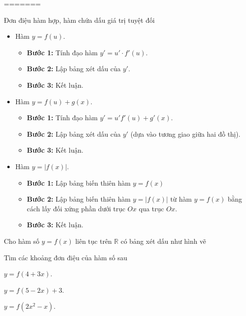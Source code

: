 =======
\begin{dang}{Đơn điệu hàm hợp, hàm chứa dấu giá trị tuyệt đối}
    \begin{itemize}
        \item Hàm $y=f(u)$.
        \begin{itemize}
            \item \textbf{Bước 1:} Tính đạo hàm $y'=u'\cdot f'(u)$.
            \item \textbf{Bước 2:} Lập bảng xét dấu của $y'$.
            \item \textbf{Bước 3:} Kết luận.
        \end{itemize}
        \item Hàm $y=f(u)+g(x)$.
        \begin{itemize}
            \item \textbf{Bước 1:} Tính đạo hàm $y'=u'f'(u)+g'(x)$.
            \item \textbf{Bước 2:} Lập bảng xét dấu của $y'$ (dựa vào tương giao giữa hai đồ thị).
            \item \textbf{Bước 3:} Kết luận.
        \end{itemize}
        \item Hàm $y=|f(x)|$.
        \begin{itemize}
            \item \textbf{Bước 1:} Lập bảng biến thiên hàm $y=f(x)$
            \item \textbf{Bước 2:} Lập bảng biến thiên hàm $y=|f(x)|$ từ hàm $y=f(x)$ bằng cách lấy đối xứng phần dưới trục $Ox$ qua trục $Ox$.
            \item \textbf{Bước 3:} Kết luận.
        \end{itemize}
    \end{itemize}
\end{dang}
\begin{vd}%
    Cho hàm số $y=f(x)$ liên tục trên $\mathbb{R}$ có bảng xét dấu như hình vẽ
    \begin{center}
    \end{center}
    Tìm các khoảng đơn điệu của hàm số sau
    \begin{listEX}[3]
        \item $y=f(4+3x)$.
        \item $y=f(5-2x)+3$.
        \item $y=f(2x^2-x)$.
    \end{listEX}
\end{vd}
